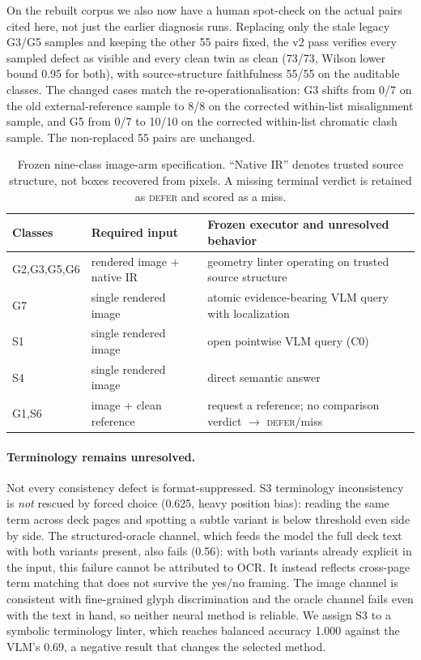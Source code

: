 \documentclass[letterpaper]{article}            %
\newcommand{\g}[1]{\textsf{#1}}        %
\begin{document}
On the rebuilt corpus we also now have a human spot-check on the actual pairs cited here, not just the earlier
diagnosis runs. Replacing only the stale legacy \g{G3}/\g{G5} samples and keeping the other 55 pairs fixed,
the v2 pass verifies every sampled defect as visible and every clean twin as clean (73/73, Wilson lower bound
0.95 for both), with source-structure faithfulness 55/55 on the auditable classes. The changed cases match the re-operationalisation: \g{G3} shifts from 0/7 on the old external-reference sample to
8/8 on the corrected within-list misalignment sample, and \g{G5} from 0/7 to 10/10 on the corrected
within-list chromatic clash sample. The non-replaced 55 pairs are unchanged.

\begin{table}[t]
\centering
\small
\setlength{\tabcolsep}{7pt}
\renewcommand{\arraystretch}{1.12}
\caption{Frozen nine-class image-arm specification. ``Native IR'' denotes trusted source structure, not boxes
recovered from pixels. A missing terminal verdict is retained as \textsc{defer} and scored as a miss.}
\label{tab:frozen-spec}
\begin{tabular}{@{}p{}p{}p{}@{}}
\toprule
Classes & Required input & Frozen executor and unresolved behavior \\
\midrule
\g{G2,G3,G5,G6} & rendered image + native IR & geometry linter operating on trusted source structure \\
\g{G7} & single rendered image & atomic evidence-bearing VLM query with localization \\
\g{S1} & single rendered image & open pointwise VLM query (C0) \\
\g{S4} & single rendered image & direct semantic answer \\
\g{G1,S6} & image + clean reference & request a reference; no comparison verdict $\to$ \textsc{defer}/miss \\
\bottomrule
\end{tabular}
\end{table}

\paragraph{Terminology remains unresolved.}
Not every consistency defect is format-suppressed. \g{S3} terminology inconsistency is \emph{not} rescued by
forced choice (0.625, heavy position bias): reading the same term across deck pages and spotting a subtle
variant is below threshold even side by side. The structured-oracle channel, which feeds the model
the full deck text with both variants present, also fails (0.56): with both variants already explicit in the
input, this failure cannot be attributed to OCR. It instead reflects cross-page term matching that does not
survive the yes/no framing. The image channel is consistent with fine-grained glyph discrimination and the oracle channel
fails even with the text in hand, so neither neural method is reliable. We assign \g{S3} to a symbolic terminology linter,
which reaches balanced accuracy 1.000 against the VLM's 0.69, a negative result that changes the selected method.
\end{document}
